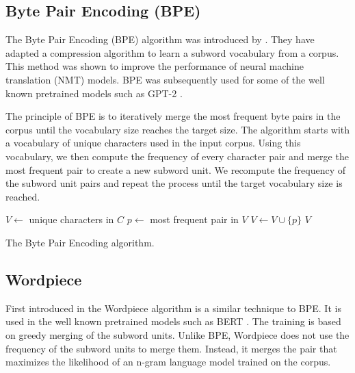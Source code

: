 
\subsection{Byte Pair Encoding (BPE)}

The Byte Pair Encoding (BPE) algorithm was introduced by \citet{Sennrich2015}. They have adapted a compression algorithm  to learn a subword vocabulary from a corpus. This method was shown to improve the performance of neural machine translation (NMT) models. BPE was subsequently used for some of the well known pretrained models such as GPT-2 \citep{Radford2019}.

The principle of BPE is to iteratively merge the most frequent byte pairs in the corpus until the vocabulary size reaches the target size. The algorithm starts with a vocabulary of unique characters used in the input corpus. Using this vocabulary, we then compute the frequency of every character pair and merge the most frequent pair to create a new subword unit. We recompute the frequency of the subword unit pairs and repeat the process until the target vocabulary size is reached.


\begin{algorithm}
    \begin{algorithmic}
        \State $V \gets$ unique characters in $C$
        \State $p \gets$ most frequent pair in $V$
        \State $V \gets V \cup \{p\}$
        \EndWhile
        \State \Return $V$
        \EndFunction
    \end{algorithmic}
    \caption{The Byte Pair Encoding algorithm.}
    \label{alg:bpe}
\end{algorithm}



\subsection{Wordpiece}

First introduced in \cite{SchusterandNakajima2012)} the Wordpiece algorithm is a similar technique to BPE. It is used in the well known pretrained models such as BERT \citep{devlin_bert_2019}. The training is based on greedy merging of the subword units. Unlike BPE, Wordpiece does not use the frequency of the subword units to merge them. Instead, it merges the pair that maximizes the likelihood of an n-gram language model trained on the corpus.

